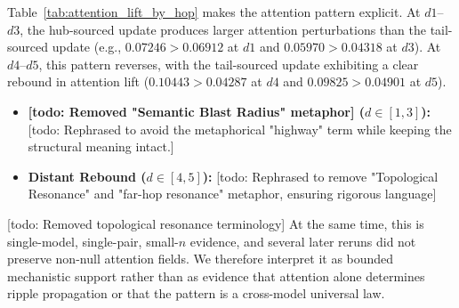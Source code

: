 Table~\ref{tab:attention_lift_by_hop} makes the attention pattern explicit. At $d1$--$d3$, the hub-sourced update produces larger attention perturbations than the tail-sourced update (e.g., $0.07246 > 0.06912$ at $d1$ and $0.05970 > 0.04318$ at $d3$). At $d4$--$d5$, this pattern reverses, with the tail-sourced update exhibiting a clear rebound in attention lift ($0.10443 > 0.04287$ at $d4$ and $0.09825 > 0.04901$ at $d5$).
\begin{itemize}
    \item \textbf{[todo: Removed "Semantic Blast Radius" metaphor] ($d \in [1, 3]$):} [todo: Rephrased to avoid the metaphorical "highway" term while keeping the structural meaning intact.]
    \item \textbf{Distant Rebound ($d \in [4, 5]$):} [todo: Rephrased to remove "Topological Resonance" and "far-hop resonance" metaphor, ensuring rigorous language]
\end{itemize}
[todo: Removed topological resonance terminology] At the same time, this is single-model, single-pair, small-$n$ evidence, and several later reruns did not preserve non-null attention fields. We therefore interpret it as bounded mechanistic support rather than as evidence that attention alone determines ripple propagation or that the pattern is a cross-model universal law.

